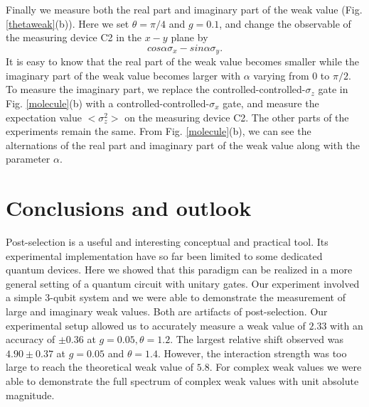 \documentclass[aps,pra,12pt,onecolumn,showpacs,superscriptaddress,floatfix,footinbib,subfigure]{revtex4}
\begin{document}
Finally we measure both the real part and imaginary part of the weak value (Fig. \ref{thetaweak}(b)). Here we set $\theta = \pi/4$ and $g=0.1$, and change the observable of the measuring device C2 in the $x-y$ plane by
 \begin{equation}\label{imag}
cos\alpha \sigma_x - sin\alpha \sigma_y.
 \end{equation}
 It is easy to know that the real part of the weak value becomes smaller while the imaginary part of the weak value becomes larger with $\alpha$ varying from 0 to $\pi/2$. To measure the imaginary part, we replace the controlled-controlled-$\sigma_z$ gate in Fig. \ref{molecule}(b) with a controlled-controlled-$\sigma_x$ gate, and measure the expectation value $<\sigma_z^2>$ on the measuring device C2. The other parts of the experiments remain the same. From Fig. \ref{molecule}(b), we can see the alternations of the real part and imaginary part of the weak value along with the parameter $\alpha$.

\section{Conclusions and outlook}
Post-selection is a useful and interesting conceptual and practical tool. Its experimental implementation have so far  been limited to {\color{red}some dedicated quantum devices}. Here we showed that this paradigm can be realized in a more general setting of a quantum circuit with unitary gates. Our experiment involved a simple 3-qubit system and we were able to demonstrate the measurement of large and imaginary weak values. Both are artifacts of post-selection. Our experimental setup allowed us to accurately measure a weak value of $2.33$ with an accuracy of $\pm0.36$ at $g=0.05, \theta=1.2$. The largest relative shift observed was  $4.90\pm  0.37$ at   $g=0.05$ and $\theta=1.4$. However, the interaction strength was too large to reach the theoretical  weak value of $5.8$.  For complex weak values we were able to demonstrate  the full spectrum of complex weak values with unit  absolute magnitude.
\end{document}
